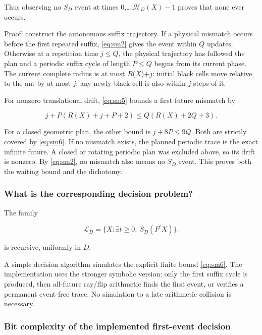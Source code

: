 \documentclass[
  11pt,
]{article}
\begin{document}
Thus observing no $S_D$ event at times 0,\ldots,$\mathcal H_D(X)-1$ proves that
none ever occurs.

Proof: construct the autonomous suffix trajectory. If a physical
mismatch occurs before the first repeated suffix, \eqref{eq:sm2} gives the event
within \(Q\) updates. Otherwise at a repetition time $j\le Q$, the
physical trajectory has followed the plan and a periodic suffix cycle of
length $P\le Q$ begins from its current phase. The current complete
radius is at most \(R\)(\(X\))+\(j\): initial black cells move relative to the ant
by at most \(j\); any newly black cell is also within \(j\) steps of it.

For nonzero translational drift, \eqref{eq:sm5} bounds a first future mismatch by

\[
j+P(R(X)+j+P+2)\le Q(R(X)+2Q+3).
\]

For a closed geometric plan, the other bound is $j+8P\le9Q$. Both
are strictly covered by \eqref{eq:sm6}. If no mismatch exists, the planned
periodic trace is the exact infinite future. A closed or rotating
periodic plan was excluded above, so its drift is nonzero. By \eqref{eq:sm2}, no
mismatch also means no $S_D$ event. This proves both the waiting bound
and the dichotomy.

\subsubsection{What is the corresponding decision
problem?}\label{what-is-the-corresponding-decision-problem}

The family

\begin{equation}\label{eq:sm7}
\mathcal L_D=\{X:\exists t\ge0,\ S_D(F^tX)\}.
\end{equation}

is recursive, uniformly in $D$.

A simple decision algorithm simulates the explicit finite bound \eqref{eq:sm6}.
The implementation uses the stronger symbolic version: only the first
suffix cycle is produced, then all-future ray/flip arithmetic finds the
first event, or verifies a permanent event-free trace. No simulation to
a late arithmetic collision is necessary.

\subsubsection{Bit complexity of the implemented first-event
decision}\label{bit-complexity-of-the-implemented-first-event-decision}
\end{document}
